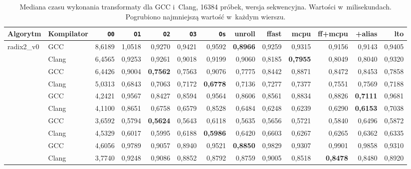 \begin{table}[H]
\centering
\caption{Mediana czasu wykonania transformaty dla GCC i~Clang, 16384 próbek,
         wersja sekwencyjna. Wartości w~milisekundach.
         Pogrubiono najmniejszą wartość w~każdym wierszu.}
\label{tab:med-merged-16k}
\scriptsize
\setlength{\tabcolsep}{3.0pt}
\begin{tabular}{llrrrrrrrrrrr}
\toprule
Algorytm & Kompilator & \texttt{O0} & \texttt{O1} & \texttt{O2} & \texttt{O3} & \texttt{Os} & unroll & ffast & mcpu & ff+mcpu & +alias & lto \\
\midrule
\multirow{2}{*}{radix2\_v0}
  & GCC   & 8,6189 & 1,0518 & 0,9270 & 0,9421 & 0,9592 & \textbf{0,8966} & 0,9259 & 0,9315 & 0,9156 & 0,9143 & 0,9405 \\
  & Clang & 6,4565 & 0,9253 & 0,9261 & 0,9018 & 0,9199 & 0,9060 & 0,8185 & \textbf{0,7955} & 0,8049 & 0,8040 & 0,9320 \\
\addlinespace
\multirow{2}{*}{radix2\_v1}
  & GCC   & 6,4426 & 0,9004 & \textbf{0,7562} & 0,7563 & 0,9076 & 0,7775 & 0,8442 & 0,8871 & 0,8472 & 0,8453 & 0,7858 \\
  & Clang & 5,0313 & 0,6843 & 0,7063 & 0,7172 & \textbf{0,6778} & 0,7136 & 0,7277 & 0,7377 & 0,7551 & 0,7569 & 0,7188 \\
\addlinespace
\multirow{2}{*}{radix2\_v2\_soa}
  & GCC   & 4,2421 & 0,9567 & 0,8427 & 0,8594 & 0,9564 & 0,8606 & 0,8561 & 0,8834 & 0,8826 & \textbf{0,7111} & 0,9681 \\
  & Clang & 4,1100 & 0,8651 & 0,6758 & 0,6579 & 0,8528 & 0,6484 & 0,6248 & 0,6239 & 0,6290 & \textbf{0,6153} & 0,7038 \\
\addlinespace
\multirow{2}{*}{radix2\_v3\_neon}
  & GCC   & 3,6592 & 0,5794 & \textbf{0,5624} & 0,5643 & 0,6118 & 0,5635 & 0,5656 & 0,5721 & 0,5840 & 0,6496 & 0,5872 \\
  & Clang & 4,5329 & 0,6017 & 0,5995 & 0,6188 & \textbf{0,5986} & 0,6420 & 0,6603 & 0,6267 & 0,6265 & 0,6362 & 0,6335 \\
\addlinespace
\multirow{2}{*}{radix4}
  & GCC   & 4,6056 & 0,9789 & 0,9057 & 0,8940 & 0,9521 & \textbf{0,8850} & 0,9829 & 0,9307 & 0,9901 & 0,9858 & 0,9310 \\
  & Clang & 3,7740 & 0,9248 & 0,9086 & 0,8852 & 0,8792 & 0,8759 & 0,9005 & 0,8518 & \textbf{0,8478} & 0,8480 & 0,8920 \\

\end{tabular}
\end{table}
